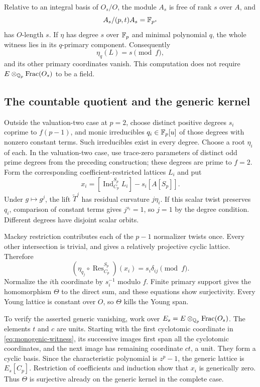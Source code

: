 Relative to an integral basis of $O_s/O$, the module $A_s$ is free
of rank $s$ over $A$, and
\[
 A_s/(p,t)A_s=\mathbb F_{p^s}
\]
has $O$-length $s$.  If $\eta$ has degree $s$ over $\mathbb F_p$ and minimal
polynomial $q$, the whole witness lies in its $q$-primary component.
Consequently
\begin{equation}\label{eq:monogenic-witness-index}
 \eta_q(L)=s\pmod f,
\end{equation}
and its other primary coordinates vanish.  This computation does not
require $E\otimes_{\mathbb Q_p}\operatorname{Frac}(O_s)$ to be a field.

\subsection{The countable quotient and the generic kernel}

Outside the valuation-two case at $p=2$, choose distinct positive
degrees $s_i$ coprime to $f(p-1)$, and monic
irreducibles $q_i\in\mathbb F_p[u]$ of those degrees with nonzero constant
terms.  Such irreducibles exist in every degree.  Choose a root
$\eta_i$ of each.  In the valuation-two case, use trace-zero
parameters of distinct odd prime degrees from the preceding
construction; these degrees are prime to $f=2$.
Form the corresponding coefficient-restricted lattices $L_i$ and put
\[
 x_i=[\operatorname{Ind}_{C_p}^{S_p}L_i]-s_i[A[S_p]].
\]
Under $g\mapsto g^j$, the lift $\widetilde T^j$ has residual
curvature $j\eta_i$.  If this scalar twist preserves $q_i$, comparison
of constant terms gives $j^{s_i}=1$, so $j=1$ by the degree condition.
Different degrees have disjoint scalar orbits.

Mackey restriction contributes each of the $p-1$ normalizer twists
once.  Every other intersection is trivial, and gives a relatively
projective cyclic lattice.  Therefore
\[
 (\eta_{q_j}\circ\operatorname{Res}_{C_p}^{S_p})(x_i)
       =s_i\delta_{ij}\pmod f.
\]
Normalize the $i$th coordinate by $s_i^{-1}$ modulo $f$.  Finite
primary support gives the homomorphism $\Theta$ to the direct sum,
and these equations show surjectivity.  Every Young lattice is
constant over $O$, so $\Theta$ kills the Young span.

To verify the asserted generic vanishing, work over
$E_s=E\otimes_{\mathbb Q_p}\operatorname{Frac}(O_s)$.  The elements $t$
and $c$ are units.  Starting with the first cyclotomic coordinate in
\eqref{eq:monogenic-witness}, its successive images first span all
the cyclotomic coordinates, and the next image has remaining
coordinate $ct$, a unit.  They form a cyclic basis.  Since the
characteristic polynomial is $z^p-1$, the generic lattice is
$E_s[C_p]$.  Restriction of coefficients and induction show that
$x_i$ is generically zero.  Thus $\Theta$ is surjective already on
the generic kernel in the complete case.

